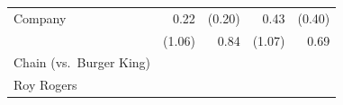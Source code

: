 \documentclass[11pt,a4paper,openany]{book}
\begin{document}
\begin{longtable}[]{@{}lrrrr@{}}
\begin{minipage}[t]{0.31\columnwidth}
Company\strut
\end{minipage} & \begin{minipage}[t]{0.19\columnwidth}\raggedleft\strut
0.22\strut
\end{minipage} & \begin{minipage}[t]{0.19\columnwidth}\raggedleft\strut
(0.20)\strut
\end{minipage} & \begin{minipage}[t]{0.08\columnwidth}\raggedleft\strut
0.43\strut
\end{minipage} & \begin{minipage}[t]{0.06\columnwidth}\raggedleft\strut
(0.40)\strut
\end{minipage}\tabularnewline
\begin{minipage}[t]{0.31\columnwidth}\raggedright\strut
\strut
\end{minipage} & \begin{minipage}[t]{0.19\columnwidth}\raggedleft\strut
(1.06)\strut
\end{minipage} & \begin{minipage}[t]{0.19\columnwidth}\raggedleft\strut
0.84\strut
\end{minipage} & \begin{minipage}[t]{0.08\columnwidth}\raggedleft\strut
(1.07)\strut
\end{minipage} & \begin{minipage}[t]{0.06\columnwidth}\raggedleft\strut
0.69\strut
\end{minipage}\tabularnewline
\begin{minipage}[t]{0.31\columnwidth}\raggedright\strut
Chain (vs.~Burger King)\strut
\end{minipage} & \begin{minipage}[t]{0.19\columnwidth}\raggedleft\strut
\strut
\end{minipage} & \begin{minipage}[t]{0.19\columnwidth}\raggedleft\strut
\strut
\end{minipage} & \begin{minipage}[t]{0.08\columnwidth}\raggedleft\strut
\strut
\end{minipage} & \begin{minipage}[t]{0.06\columnwidth}\raggedleft\strut
\strut
\end{minipage}\tabularnewline
\begin{minipage}[t]{0.31\columnwidth}\raggedright\strut
Roy Rogers\strut
\end{minipage} & \begin{minipage}[t]{0.19\columnwidth}\raggedleft\strut

\end{minipage}
\end{longtable}
\end{document}
